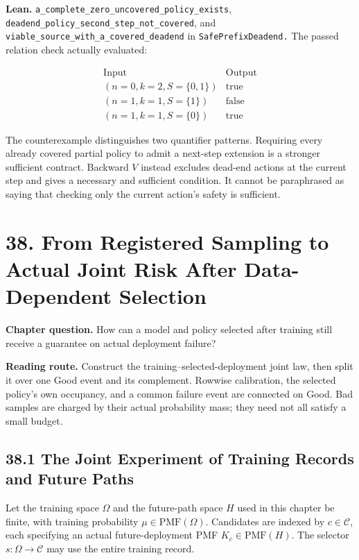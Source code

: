 \documentclass[
  english,
  11pt,
  oneside]{book}
\begin{document}
\textbf{Lean.} \nolinkurl{a_complete_zero_uncovered_policy_exists}, \nolinkurl{deadend_policy_second_step_not_covered}, and \nolinkurl{viable_source_with_a_covered_deadend} in \nolinkurl{SafePrefixDeadend.} The passed relation check actually evaluated:

\[\begin{array}{c|c}
\text{Input}&\text{Output}\\ \hline
(n=0,k=2,S=\{0,1\})&\mathrm{true}\\
(n=1,k=1,S=\{1\})&\mathrm{false}\\
(n=1,k=1,S=\{0\})&\mathrm{true}
\end{array}\]

The counterexample distinguishes two quantifier patterns. Requiring every already covered partial policy to admit a next-step extension is a stronger sufficient contract. Backward \(V\) instead excludes dead-end actions at the current step and gives a necessary and sufficient condition. It cannot be paraphrased as saying that checking only the current action's safety is sufficient.

\chapter{38. From Registered Sampling to Actual Joint Risk After Data-Dependent Selection}\label{ch-38}

\textbf{Chapter question.} How can a model and policy selected after training still receive a guarantee on actual deployment failure?

\textbf{Reading route.} Construct the training--selected-deployment joint law, then split it over one Good event and its complement. Rowwise calibration, the selected policy's own occupancy, and a common failure event are connected on Good. Bad samples are charged by their actual probability mass; they need not all satisfy a small budget.

\section{38.1 The Joint Experiment of Training Records and Future Paths}\label{the-joint-experiment-of-training-records-and-future-paths}

Let the training space \(\Omega\) and the future-path space \(H\) used in this chapter be finite, with training probability \(\mu\in\mathrm{PMF}(\Omega)\). Candidates are indexed by \(c\in\mathcal C\), each specifying an actual future-deployment PMF \(K_c\in\mathrm{PMF}(H)\). The selector \(s:\Omega\to\mathcal C\) may use the entire training record.
\end{document}
